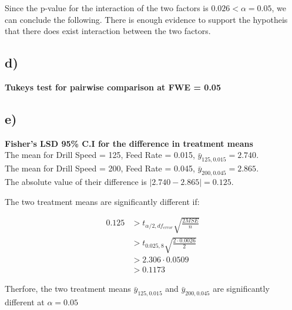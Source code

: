 \documentclass{article}
\begin{document}
Since the p-value for the interaction of the two factors is $0.026 < \alpha = 0.05$, we can conclude the following.
There is enough evidence to support the hypotheis that there does exist interaction between the two factors. 
\subsection*{d)}

\textbf{Tukeys test for pairwise comparison at FWE = 0.05} \\
\subsection*{e)}
\textbf{Fisher's LSD 95\% C.I for the difference in treatment means} \\
The mean for Drill Speed = 125, Feed Rate = 0.015, $\bar{y}_{125, 0.015} = 2.740$. \\
The mean for Drill Speed = 200, Feed Rate = 0.045, $\bar{y}_{200, 0.045} = 2.865$. \\
The absolute value of their difference is $\left| 2.740 - 2.865 \right| = 0.125$.
\begin{flushleft}
The two treatment means are significantly different if:
\end{flushleft}
\begin{align*}
    0.125 &> t_{\alpha/2, df_{error}}\sqrt{\frac{2 MSE}{n}} \\
          &> t_{0.025, 8}\sqrt{\frac{2 \cdot 0.0026}{2}} \\
          &> 2.306 \cdot 0.0509 \\
          &> 0.1173
\end{align*}
\begin{flushleft}
Therfore, the two treatment means $\bar{y}_{125, 0.015}$ and $\bar{y}_{200, 0.045}$ are significantly different at $\alpha = 0.05$
\end{flushleft}
\end{document}
